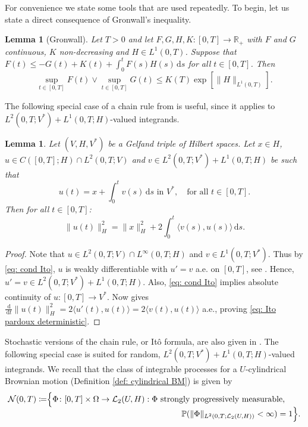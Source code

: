 \documentclass{amsart}
\newcommand{\dd}{\,\mathrm{d}}
\newcommand{\UH}{\mathcal{L}_2(U,H)}
\newcommand{\<}{\langle}
\newcommand{\?}{\rangle}
\theoremstyle{plain}
\theoremstyle{remark}
\theoremstyle{plain}
\newtheorem{lemma}[theorem]{Lemma}
\numberwithin{equation}{section}
\def\R{{\mathbb R}}
\renewcommand{\P}{\mathbb{P}}
\newcommand{\Om}{\Omega}
\begin{document}
\appendix

\section{}\label{appendix}

For convenience we state some tools that are used repeatedly. To begin, let us state a direct consequence of Gronwall's inequality.

\begin{lemma}[Gronwall]\label{lem: gronwall consequence}
Let $T>0$ and let $F,G,H,K\colon [0,T]\to\R_+$ with $F$ and $G$ continuous, $K$ non-decreasing and $H\in L^1(0,T)$.
Suppose that $F(t)\leq -G(t)+K(t)+\int_0^t F(s)H(s)\dd s$ for all $t\in[0,T]$.
Then
\[
\sup_{t\in[0,T]}F(t)\vee \sup_{t\in[0,T]}G(t)\leq K(T)\exp[\|H\|_{L^1(0,T)}].
\]
\end{lemma}

The following special case of a chain rule from \cite{pardoux} is useful, since it applies to $L^2(0,T;V^*)+L^1(0,T;H)$-valued integrands.

\begin{lemma}{\cite[Lem. 2.2 p. 30]{pardoux}}
Let $(V,H,V^*)$ be a Gelfand triple of Hilbert spaces. Let $x\in H$, $u\in C([0,T];H)\cap L^2(0,T;V)$ and $v\in L^2(0,T;V^*)+L^1(0,T;H)$ be such that
\begin{equation}\label{eq: cond Ito}
u(t)=x+\int_0^t v(s)\dd s \text{ in }  V^*,\quad \text{for all }t\in[0,T].
\end{equation}
Then for all $t\in[0,T]$:
\begin{equation}\label{eq: Ito pardoux deterministic}
\|u(t)\|_H^2=\|x\|_H^2+2\int_0^t \<v(s),u(s)\?\dd s.
\end{equation}
\end{lemma}
\begin{proof}
Note that $u\in L^2(0,T;V)\cap L^\infty(0,T;H)$ and $v\in L^1(0,T;V^*)$. Thus by \eqref{eq: cond Ito}, $u$ is weakly differentiable with $u'=v$ a.e. \!on $[0,T]$, see \cite[Lem. 2.5.8]{HNVWvolume1}. Hence, $u'=v\in L^2(0,T;V^*)+L^1(0,T;H)$. Also, \eqref{eq: cond Ito} implies absolute continuity of $u:[0,T]\to V^*$.   Now \cite[Lem. 2.2  p. 30, $p=2$]{pardoux} gives $\frac{\dd}{\dd t}\|u(t)\|_H^2=2\<u'(t),u(t)\?=2\<v(t),u(t)\?$ a.e., proving  \eqref{eq: Ito pardoux deterministic}.
\end{proof}


Stochastic versions of the chain rule, or It\^o formula, are  also given in \cite{pardoux}. The following special case is suited for random, $L^2(0,T;V^*)+L^1(0,T;H)$-valued integrands.  We recall that the class of integrable processes for a $U$-cylindrical Brownian motion (Definition \ref{def: cylindrical BM}) is given by
\begin{align}\label{eq: def class integrable processes}
\mathcal{N}(0,T)\coloneqq& \Bigl\{\Phi\colon [0,T]\times \Om\to \UH: \Phi \text{ strongly progressively measurable, }\\[-0.15cm]
&\hspace{5.7cm}\P(\|{\Phi}\|_{L^2(0,T;\UH)}<\infty)=1\Bigr\}.\notag
\end{align}
\end{document}
